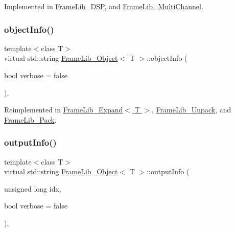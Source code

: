 Implemented in \hyperlink{class_frame_lib___d_s_p_a6c0e00484c67ea160cf87ec644807cac}{Frame\+Lib\+\_\+\+D\+SP}, and \hyperlink{class_frame_lib___multi_channel_a25159857f4088cf179c1d7c3d62cac76}{Frame\+Lib\+\_\+\+Multi\+Channel}.

\mbox{\label{class_frame_lib___object_a10d673de9a3c59ace6a22ba1cff313c8}} 
\subsubsection{\texorpdfstring{object\+Info()}{objectInfo()}}
{\footnotesize\ttfamily template$<$class T$>$ \\
virtual std\+::string \hyperlink{class_frame_lib___object}{Frame\+Lib\+\_\+\+Object}$<$ T $>$\+::object\+Info (\begin{DoxyParamCaption}\item[{bool}]{verbose = {\ttfamily false} }\end{DoxyParamCaption})\hspace{0.3cm}{\ttfamily [inline]}, {\ttfamily [virtual]}}



Reimplemented in \hyperlink{class_frame_lib___expand_ac4527eab2bfb55a38bd796d95f2a2562}{Frame\+Lib\+\_\+\+Expand$<$ T $>$}, \hyperlink{class_frame_lib___unpack_ab298a6feb7c051f3563a01caacd99c02}{Frame\+Lib\+\_\+\+Unpack}, and \hyperlink{class_frame_lib___pack_aa15c5f54847d99c3bd3f9c2cf7688fd2}{Frame\+Lib\+\_\+\+Pack}.

\mbox{\label{class_frame_lib___object_a6e6d79e8d620eedbaa50abf324cdedf5}} 
\subsubsection{\texorpdfstring{output\+Info()}{outputInfo()}}
{\footnotesize\ttfamily template$<$class T$>$ \\
virtual std\+::string \hyperlink{class_frame_lib___object}{Frame\+Lib\+\_\+\+Object}$<$ T $>$\+::output\+Info (\begin{DoxyParamCaption}\item[{unsigned long}]{idx,  }\item[{bool}]{verbose = {\ttfamily false} }\end{DoxyParamCaption})\hspace{0.3cm}{\ttfamily [inline]}, {\ttfamily [virtual]}}



